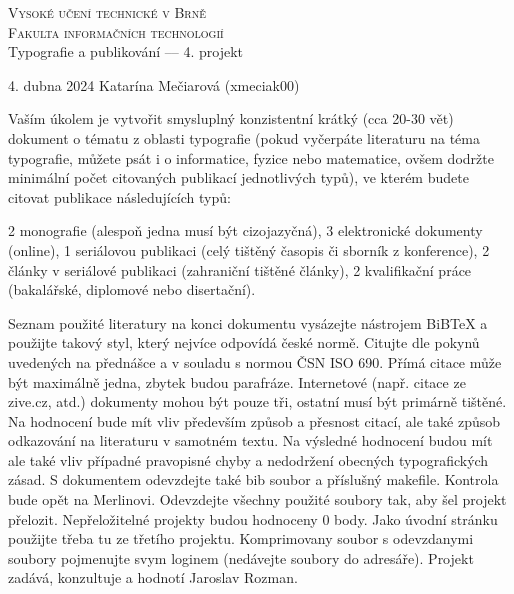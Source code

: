 \documentclass[11pt]{article}
\begin{document}
    \begin{titlepage}
        \begin{center}
            \Huge\textsc{Vysoké učení technické v Brně}\\
            \huge\textsc{Fakulta informačních technologií}\\
            {Typografie a publikování –– 4. projekt}\\

        \end{center}
        {\LARGE 4. dubna 2024 \hfill
        Katarína Mečiarová (xmeciak00)}

    \end{titlepage}

    Vaším úkolem je vytvořit smysluplný konzistentní krátký (cca 20-30 vět) dokument o tématu z oblasti typografie (pokud vyčerpáte literaturu na téma typografie, můžete psát i o informatice, fyzice nebo matematice, ovšem dodržte minimální počet citovaných publikací jednotlivých typů), ve kterém budete citovat publikace následujících typů:

    2 monografie (alespoň jedna musí být cizojazyčná),
    3 elektronické dokumenty (online),
    1 seriálovou publikaci (celý tištěný časopis či sborník z konference),
    2 články v seriálové publikaci (zahraniční tištěné články),
    2 kvalifikační práce (bakalářské, diplomové nebo disertační).

    Seznam použité literatury na konci dokumentu vysázejte nástrojem BiBTeX a použijte takový styl, který nejvíce odpovídá české normě. Citujte dle pokynů uvedených na přednášce a v souladu s normou ČSN ISO 690. Přímá citace může být maximálně jedna, zbytek budou parafráze. Internetové (např. citace ze zive.cz, atd.) dokumenty mohou být pouze tři, ostatní musí být primárně tištěné. Na hodnocení bude mít vliv především způsob a přesnost citací, ale také způsob odkazování na literaturu v samotném textu. Na výsledné hodnocení budou mít ale také vliv případné pravopisné chyby a nedodržení obecných typografických zásad. S dokumentem odevzdejte také bib soubor a příslušný makefile. Kontrola bude opět na Merlinovi. Odevzdejte všechny použité soubory tak, aby šel projekt přelozit. Nepřeložitelné projekty budou hodnoceny 0 body. Jako úvodní stránku použijte třeba tu ze třetího projektu. Komprimovany soubor s odevzdanymi soubory pojmenujte svym loginem (nedávejte soubory do adresáře). Projekt zadává, konzultuje a hodnotí Jaroslav Rozman.
\end{document}
